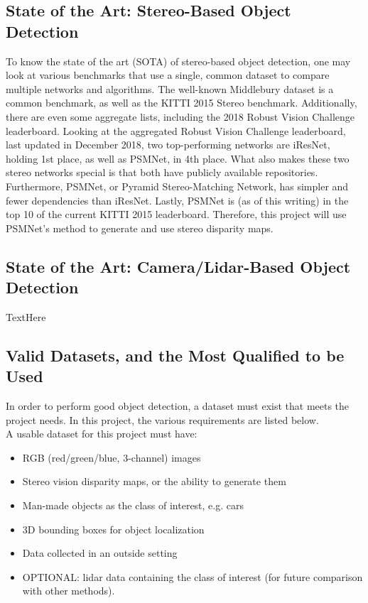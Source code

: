 \subsection{State of the Art: Stereo-Based Object Detection}
To know the state of the art (SOTA) of stereo-based object detection, one may look at various benchmarks that use a single, common dataset to compare multiple networks and algorithms. The well-known Middlebury \cite{scharstein2014high,middlebury_leaderboard} dataset is a common benchmark, as well as the KITTI \cite{geiger_are_2012,kitti_leaderboard} 2015 Stereo benchmark. Additionally, there are even some aggregate lists, including the 2018 Robust Vision Challenge \cite{rvc_leaderboard} leaderboard. Looking at the aggregated Robust Vision Challenge leaderboard, last updated in December 2018, two top-performing networks are iResNet, holding 1st place, as well as PSMNet, in 4th place. What also makes these two stereo networks special is that both have publicly available repositories. Furthermore, PSMNet, or Pyramid Stereo-Matching Network, has simpler and fewer dependencies than iResNet. Lastly, PSMNet is (as of this writing) in the top 10 of the current KITTI 2015 leaderboard. Therefore, this project will use PSMNet's method to generate and use stereo disparity maps. 

\subsection{State of the Art: Camera/Lidar-Based Object Detection}
TextHere

\subsection{Valid Datasets, and the Most Qualified to be Used}
In order to perform good object detection, a dataset must exist that meets the project needs. In this project, the various requirements are listed below. \\

A usable dataset for this project must have: 
\begin{itemize} \itemsep=-0.5em
    \item RGB (red/green/blue, 3-channel) images
    \item Stereo vision disparity maps, or the ability to generate them
    \item Man-made objects as the class of interest, e.g. cars
    \item 3D bounding boxes for object localization
    \item Data collected in an outside setting
    \item OPTIONAL: lidar data containing the class of interest (for future comparison with other methods).
\end{itemize}

